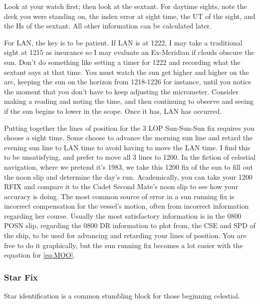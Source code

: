 \documentclass[letterpaper,12pt]{article}
\begin{document}
Look at your watch first; then look at the sextant.
For daytime sights, note the deck you were standing on, the index error at sight time, the UT of the sight, and the Hs of the sextant.
All other information can be calculated later.

For LAN, the key is to be patient. If LAN is at 1222, I may take a traditional sight at 1215 as insurance so I may evaluate an Ex-Meridian if clouds obscure the sun.
Don't do something like setting a timer for 1222 and recording what the sextant says at that time.
You must watch the sun get higher and higher on the arc, keeping the sun on the horizon from 1218-1226 for instance, until you notice the moment that you don't have to keep adjusting the micrometer.
Consider making a reading and noting the time, and then continuing to observe and seeing if the sun begins to lower in the scope.
Once it has, LAN has occurred.

Putting together the lines of position for the 3 LOP Sun-Sun-Sun fix requires you choose a sight time.
Some choose to advance the morning sun line and retard the evening sun line to LAN time to avoid having to move the LAN time.
I find this to be unsatisfying, and prefer to move all 3 lines to 1200.
In the fiction of celestial navigation, where we pretend it's 1983, we take this 1200 fix of the sun to fill out the noon slip and determine the day's run.
Academically, you can take your 1200 RFIX and compare it to the Cadet Second Mate's noon slip to see how your accuracy is doing.
The most common source of error in a sun running fix is incorrect compensation for the vessel's motion, often from incorrect information regarding her course.
Usually the most satisfactory information is in the 0800 POSN slip, regarding the 0800 DR information to plot from, the CSE and SPD of the ship, to be used for advancing and retarding your lines of position. You are free to do it graphically, but the sun running fix becomes a lot easier with the equation for \ref{eq:MOO}.
\subsubsection*{Star Fix}
Star identification is a common stumbling block for those beginning celestial.
\end{document}
